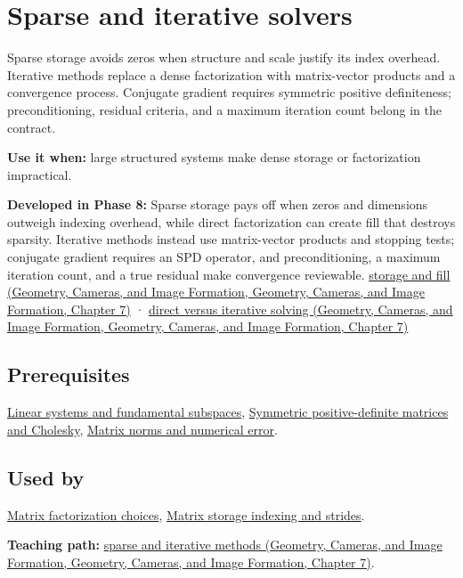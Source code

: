 \hypertarget{appendix-67c87a3d9e94}{}\label{referencestart:appendix-67c87a3d9e94}
\section{Sparse and iterative solvers}\label{appendix-67c87a3d9e94-sparse-and-iterative-solvers}

Sparse storage avoids zeros when structure and scale justify its index overhead. Iterative methods replace a dense factorization with matrix-vector products and a convergence process. Conjugate gradient requires symmetric positive definiteness; preconditioning, residual criteria, and a maximum iteration count belong in the contract.

\textbf{Use it when:} large structured systems make dense storage or factorization impractical.

\textbf{Developed in Phase 8:} Sparse storage pays off when zeros and dimensions outweigh indexing overhead, while direct factorization can create fill that destroys sparsity. Iterative methods instead use matrix-vector products and stopping tests; conjugate gradient requires an SPD operator, and preconditioning, a maximum iteration count, and a true residual make convergence reviewable. \href{../03-Geometry-Cameras-and-Image-Formation/main.pdf\#nameddest=02-foundations-ii-ch038-sparse-storage-changes-the-cost-model}{storage and fill (Geometry, Cameras, and Image Formation, Geometry, Cameras, and Image Formation, Chapter 7)} · \href{../03-Geometry-Cameras-and-Image-Formation/main.pdf\#nameddest=02-foundations-ii-ch038-direct-and-iterative-solvers-suit-different-workloads}{direct versus iterative solving (Geometry, Cameras, and Image Formation, Geometry, Cameras, and Image Formation, Chapter 7)}

\subsection{Prerequisites}\label{appendix-67c87a3d9e94-prerequisites}

\hyperref[appendix-8572a4a060c1]{Linear systems and fundamental subspaces}, \hyperref[appendix-50d2ea3c9b26]{Symmetric positive-definite matrices and Cholesky}, \hyperref[appendix-f8657bac66e5]{Matrix norms and numerical error}.

\subsection{Used by}\label{appendix-67c87a3d9e94-used-by}

\hyperref[appendix-221a483bec2d]{Matrix factorization choices}, \hyperref[appendix-ffdc1d4e5350]{Matrix storage indexing and strides}.

\textbf{Teaching path:} \href{../03-Geometry-Cameras-and-Image-Formation/main.pdf\#nameddest=02-foundations-ii-ch038-sparse-problems-change-the-economics-of-solving}{sparse and iterative methods (Geometry, Cameras, and Image Formation, Geometry, Cameras, and Image Formation, Chapter 7)}.
